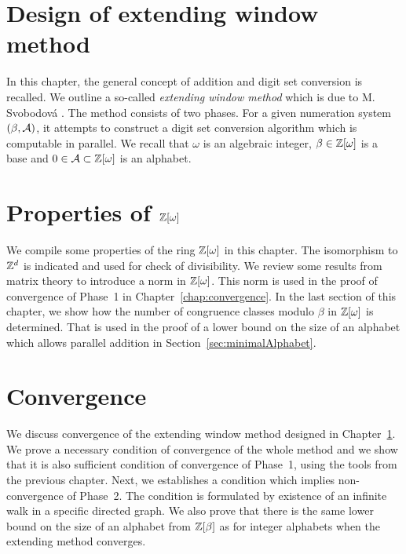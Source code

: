 \documentclass[11pt,a4paper]{report}	%
\theoremstyle{definition}
\begin{document}
\chapter{Design of extending window method}
\label{chap:ewm}
In this chapter, the general concept of addition and digit set conversion is recalled. We outline a so-called \emph{extending window method} which is due to M. Svobodov\'a \cite{milena}. The method consists of two phases. For a given numeration system $(\beta,\mathcal{A})$, it attempts to construct a digit set conversion algorithm which is computable in parallel. We recall that $\omega$ is an algebraic integer, $\beta \in \mathbb{Z}[\omega]$ is a base and $0\in\mathcal{A}\subset\mathbb{Z}[\omega]$ is an alphabet. 


	

\chapter{\texorpdfstring{Properties of $\mathbb{Z}[\omega]$}{Properties of Z[omega]}}
\label{chap:Zomega}
We compile some properties  of the ring $\mathbb{Z}[\omega]$ in this chapter. The isomorphism to $\mathbb{Z}^d$ is indicated and used for check of divisibility.  We review some results from matrix theory to introduce a norm in $\mathbb{Z}[\omega]$. This norm is used in the proof of convergence of Phase~1 in Chapter~\ref{chap:convergence}. In the last section of this chapter, we show how the number of congruence classes modulo $\beta$ in $\mathbb{Z}[\omega]$ is determined. That is used in the proof of a lower bound on the size of an alphabet which allows parallel addition in Section~\ref{sec:minimalAlphabet}.
	
	
		
	
\chapter{Convergence}
We discuss convergence of the extending window method designed in Chapter~\ref{chap:ewm}. We prove a necessary condition of convergence of the whole method and we show that it is also sufficient condition of convergence of Phase~1, using the tools from the previous chapter. Next, we establishes a condition which implies non-convergence of Phase~2. The condition is formulated by existence of an infinite walk in a specific directed graph. We also prove that there is the same lower bound on the size of an alphabet from $\mathbb{Z}[\beta]$ as for integer alphabets when the extending method converges.
\label{chap:convergence}
\end{document}
